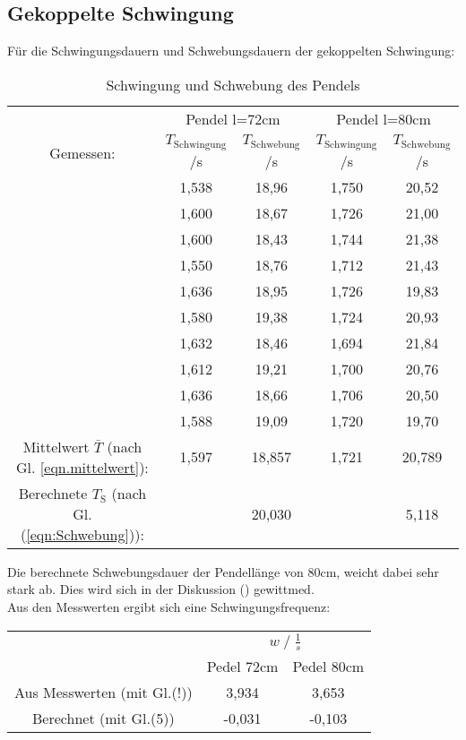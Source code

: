 \subsection{Gekoppelte Schwingung}
Für die Schwingungsdauern und Schwebungsdauern der gekoppelten Schwingung:
\begin{table}
    \centering
    \label{tab:Data_schw}
    \caption{Schwingung und Schwebung des Pendels}
    \begin{tabular}{c c | c || c | c}
        \toprule
        & \multicolumn{2}{c}{Pendel l=72cm} & \multicolumn{2}{c}{Pendel l=80cm} \\
        \cmidrule(lr){2-3}\cmidrule(lr){4-5}
        Gemessen: & $T_\text{Schwingung}$\;/\;s & $T_\text{Schwebung}$\;/\;s & $T_\text{Schwingung}$\;/\;s & $T_\text{Schwebung}$\;/\;s\\
        \midrule
        & 1,538 & 18,96 & 1,750 & 20,52 \\   
        & 1,600 & 18,67 & 1,726 & 21,00 \\
        & 1,600 & 18,43 & 1,744 & 21,38 \\
        & 1,550 & 18,76 & 1,712 & 21,43 \\
        & 1,636 & 18,95 & 1,726 & 19,83 \\
        & 1,580 & 19,38 & 1,724 & 20,93 \\
        & 1,632 & 18,46 & 1,694 & 21,84 \\
        & 1,612 & 19,21 & 1,700 & 20,76 \\
        & 1,636 & 18,66 & 1,706 & 20,50 \\
        & 1,588 & 19,09 & 1,720 & 19,70 \\
        \midrule
        Mittelwert $\bar{T}$ (nach Gl. \ref{eqn.mittelwert}): & 1,597 & 18,857 & 1,721 & 20,789 \\
        Berechnete $T_\textrm{S}$ (nach Gl.(\ref{eqn:Schwebung})):  &       & 20,030 &       &  5,118 \\
        \bottomrule
    \end{tabular}
\end{table}
Die berechnete Schwebungsdauer der Pendellänge von 80cm, weicht dabei sehr stark ab. Dies wird sich in der Diskussion () gewittmed.\\

Aus den Messwerten ergibt sich eine Schwingungsfrequenz:
\begin{table}
    \centering
    \label{tab:frq_gleichs}
    \begin{tabular}{c c c}
        \toprule
        & \multicolumn{2}{c}{$w\;/\;\frac{1}{s}$}\\
        \cmidrule(lr){2-3} 
        & Pedel 72cm & Pedel 80cm\\
        \midrule
        Aus Messwerten (mit Gl.(!)) & 3,934 & 3,653 \\
        Berechnet (mit Gl.(5))      & -0,031 & -0,103 \\
        \bottomrule
    \end{tabular}
\end{table}

